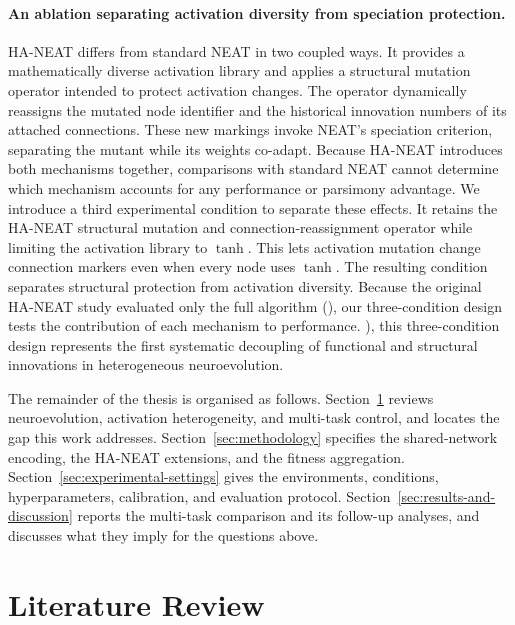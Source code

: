 \documentclass[12pt]{article}
\begin{document}
\paragraph{An ablation separating activation diversity from speciation protection.}
HA-NEAT \parencite{hagg_evolving_2017} differs from standard NEAT \parencite{stanley_evolving_2002} in two coupled ways. 
It provides a mathematically diverse activation library and applies a structural mutation operator intended to protect activation changes. 
The operator dynamically reassigns the mutated node identifier and the historical innovation numbers of its attached connections. 
These new markings invoke NEAT's speciation criterion, separating the mutant while its weights co-adapt. 
Because HA-NEAT introduces both mechanisms together, comparisons with standard NEAT cannot determine which mechanism accounts for any performance or parsimony advantage.
We introduce a third experimental condition to separate these effects. 
It retains the HA-NEAT structural mutation and connection-reassignment operator while limiting the activation library to $\tanh$. 
This lets activation mutation change connection markers even when every node uses $\tanh$.
The resulting condition separates structural protection from activation diversity. 
Because the original HA-NEAT study evaluated only the full algorithm (\cite{hagg_evolving_2017}), our three-condition design tests the contribution of each mechanism to performance.
\cite{hagg_evolving_2017}), this three-condition design represents the first systematic decoupling of functional and structural innovations in heterogeneous neuroevolution.


The remainder of the thesis is organised as follows.
Section~\ref{sec:literature-review} reviews neuroevolution, activation heterogeneity, and multi-task control, and locates the gap this work addresses.
Section~\ref{sec:methodology} specifies the shared-network encoding, the HA-NEAT extensions, and the fitness aggregation.
Section~\ref{sec:experimental-settings} gives the environments, conditions, hyperparameters, calibration, and evaluation protocol.
Section~\ref{sec:results-and-discussion} reports the multi-task comparison and its follow-up analyses, and discusses what they imply for the questions above.

\newpage
\section{Literature Review}
\label{sec:literature-review}
\end{document}
